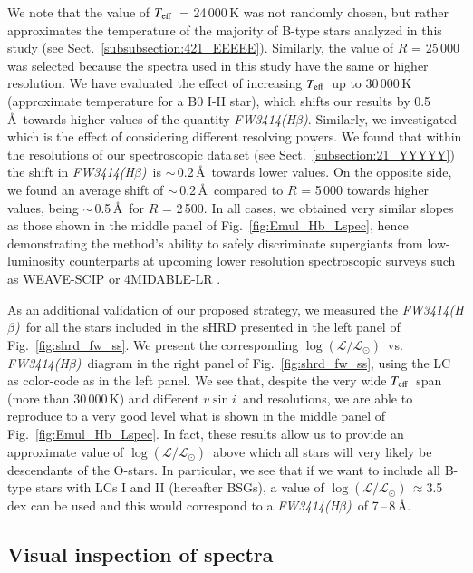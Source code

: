 \documentclass{aa}
\newcommand{\vsini}{\mbox{$v\sin i$}}
\newcommand{\Teff}{\mbox{$T_{\rm eff}$}}
\newcommand{\logLs}{$\log (\mathcal{L}/\mathcal{L}_{\odot})$}
\newcommand{\fwhb}{\textit{FW3414(H$\beta$)}}
\begin{document}
We note that the value of \Teff\ = 24\,000\,K was not randomly chosen, but rather approximates the temperature of the majority of B-type stars analyzed in this study (see Sect.~\ref{subsubsection:421_EEEEE}). Similarly, the value of $R$ = 25\,000 was selected because the spectra used in this study have the same or higher resolution. We have evaluated the effect of increasing \Teff\ up to 30\,000\,K (approximate temperature for a B0 I-II star), which shifts our results by 0.5\,\AA\ towards higher values of the quantity \fwhb. Similarly, we investigated which is the effect of considering different resolving powers. We found that within the resolutions of our spectroscopic data\,set (see Sect.~\ref{subsection:21_YYYYY}) the shift in \fwhb\ is $\sim$\,0.2\,\AA\ towards lower values. On the opposite side, we found an average shift of $\sim$\,0.2\,\AA\ compared to $R$ = 5\,000 towards higher values, being $\sim$\,0.5\,\AA\ for $R$ = 2\,500. In all cases, we obtained very similar slopes as those shown in the middle panel of Fig.~\ref{fig:Emul_Hb_Lspec}, hence demonstrating the method's ability to safely discriminate supergiants from low-luminosity counterparts at upcoming lower resolution spectroscopic surveys such as WEAVE-SCIP \citep{2020SPIE11447E..14D,2023MNRAS.tmp..715J} or 4MIDABLE-LR \citep{2019Msngr.175...30C}.

As an additional validation of our proposed strategy, we measured the \fwhb\ for all the stars included in the sHRD presented in the left panel of Fig.~\ref{fig:shrd_fw_ss}. We present the corresponding \logLs\ vs. \fwhb\ diagram in the right panel of Fig.~\ref{fig:shrd_fw_ss}, using the LC as color-code as in the left panel. We see that, despite the very wide \Teff\ span (more than 30\,000\,K) and different \vsini\ and resolutions, we are able to reproduce to a very good level what is shown in the middle panel of Fig.~\ref{fig:Emul_Hb_Lspec}. In fact, these results allow us to provide an approximate value of \logLs\ above which all stars will very likely be descendants of the O-stars. In particular, we see that if we want to include all B-type stars with LCs I and II (hereafter BSGs), a value of \logLs\,$\approx$3.5\,dex can be used and this would correspond to a \fwhb\ of 7\,--\,8\,\AA.




\subsection{Visual inspection of spectra}
\label{subsection:32_YYYYY}
\end{document}
